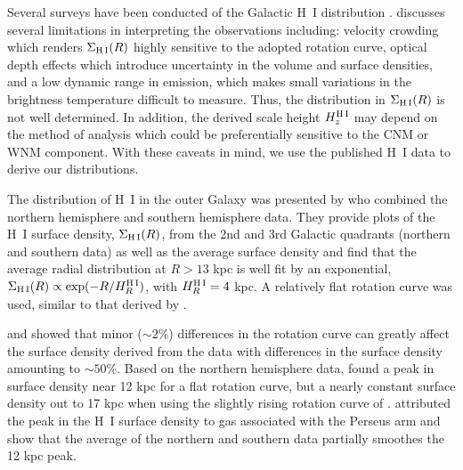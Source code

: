 \documentclass[12pt,preprint,flushrt]{aastex}
\begin{document}
Several surveys have been conducted of the Galactic
H~I distribution \cite[e.g.,][]{ww73,bur85,kerr86,sta92,hart97}.
\cite{loc02} discusses several
limitations in interpreting the observations including:
velocity crowding which renders $\Sigma_{\rm H\, I}(R)$ highly  sensitive
to the adopted rotation curve, optical depth effects which introduce
uncertainty in the volume and surface densities, and a low
dynamic range in emission, which makes small variations in the brightness
temperature difficult to measure. Thus, the distribution in
$\Sigma_{\rm H\, I}(R)$ is not well determined. In addition, the derived
scale height $H_z^{\rm H\, I}$ may depend on the method of analysis
which could be preferentially sensitive to the CNM or WNM  component.
With these caveats in mind, we use the published H~I data to derive
our distributions.

The distribution of H~I in the outer Galaxy was presented by
\cite{wou90} who
combined the northern hemisphere \citep{kerr86,bur85} and
southern hemisphere \citep{kerr86} data.
They provide plots of
the H~I surface  density, $\Sigma_{\rm H\,I}(R)$, from the 2nd and 3rd
Galactic quadrants (northern and southern data) as well as the
average surface density and find that the
average radial distribution at $R > 13$ kpc is well
fit by an exponential,
$\Sigma_{\rm H\,I}(R)\propto \exp(-R/H_R^{\rm H\,I})$, with
$H_R^{\rm H\,I}=4$ kpc.
A relatively flat rotation curve was used,
similar to that derived by  \cite{brand93}.

\cite{dam93} and \cite{loc88} showed
that minor ($\sim 2$\%) differences in the
rotation curve can greatly affect the surface density
derived from the data with differences in the surface density amounting
to $\sim 50$\%.  Based on the northern hemisphere
data, \cite{dam93} found a peak in surface density near 12 kpc
for a flat rotation curve, but a nearly constant surface density out
to 17 kpc when using the slightly  rising rotation curve of \cite{kul82}.
\cite{wou90} attributed the peak in the H~I surface density to gas
associated with the
Perseus arm and show that the average of the northern and southern data
partially smoothes the 12 kpc peak.
\end{document}
